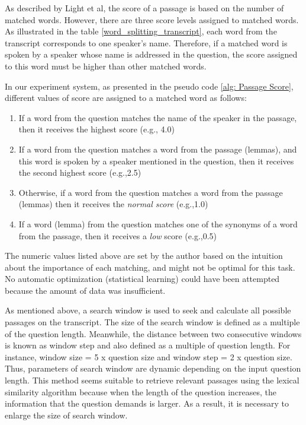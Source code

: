 As described by Light et al, the score of a passage is based on the number of matched words. However, there are three score levels assigned to matched words. As illustrated in the table \ref{word_splitting_transcript}, each word from the transcript corresponds to one speaker's name. Therefore, if a matched word is spoken by a speaker whose name is addressed in the question, the score assigned to this word must be higher than other matched words. 

In our experiment system, as presented in the pseudo code \ref{alg: Passage Score}, different values of score are assigned to a matched word as follows: 
\begin{enumerate}
\item {If a word from the question matches the name of the speaker in the passage, then it receives the highest score (e.g., 4.0)}
\item {If a word from the question matches a word from the passage (lemmas), and this word is spoken by a speaker mentioned in the question, then it receives the second highest score (e.g.,2.5)}
\item{Otherwise, if a word from the question matches a word from the passage (lemmas) then it receives the \textit{normal score} (e.g.,1.0)}
\item{If a word (lemma) from the question matches one of the synonyms of a word from the passage, then it receives a \textit{low} score (e.g.,0.5)}
\end{enumerate}

The numeric values listed above are set by the author based on the intuition about the importance of each matching, and might not be optimal for this task. No automatic optimization (statistical learning) could have been attempted because the amount of data was insufficient.


As mentioned above, a search window is used to seek and calculate all possible passages on the transcript. The size of the search window is defined as a multiple of the question length. Meanwhile, the distance between two consecutive windows is known as window step and also defined as a multiple of question length. For instance, window size = 5 x question size and window step = 2 x question size. Thus, parameters of search window are dynamic depending on the input question length. This method seems suitable to retrieve relevant passages using the lexical similarity algorithm because when the length of the question increases, the information that the question demands is larger. As a result, it is necessary to enlarge the size of search window.

